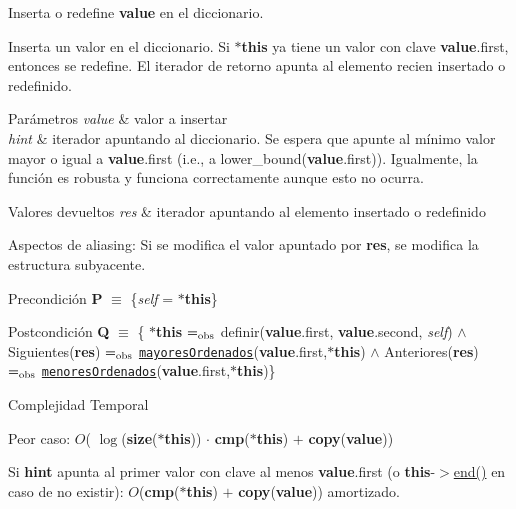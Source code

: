 Inserta o redefine {\bfseries value} en el diccionario. 

Inserta un valor en el diccionario. Si {\bfseries $\ast$this} ya tiene un valor con clave {\bfseries value}.first, entonces se redefine. El iterador de retorno apunta al elemento recien insertado o redefinido.


\begin{DoxyParams}{Parámetros}
{\em value} & valor a insertar \\
\hline
{\em hint} & iterador apuntando al diccionario. Se espera que apunte al mínimo valor mayor o igual a {\bfseries value}.first (i.\-e., a lower\-\_\-bound({\bfseries value}.first)). Igualmente, la función es robusta y funciona correctamente aunque esto no ocurra. \\
\hline
\end{DoxyParams}

\begin{DoxyRetVals}{Valores devueltos}
{\em res} & iterador apuntando al elemento insertado o redefinido\\
\hline
\end{DoxyRetVals}
\begin{DoxyParagraph}{Aspectos de aliasing\-:}
Si se modifica el valor apuntado por {\bfseries res}, se modifica la estructura subyacente.
\end{DoxyParagraph}
\begin{DoxyPrecond}{Precondición}
{\bfseries P} $\equiv$ \{{\itshape self} = {\bfseries $\ast$this}\} 
\end{DoxyPrecond}
\begin{DoxyPostcond}{Postcondición}
{\bfseries Q} $\equiv$ \{ {\bfseries $\ast$this} $=_{\rm obs}$ definir({\bfseries value}.first, {\bfseries value}.second, {\itshape self}) $\land$ Siguientes({\bfseries res}) $=_{\rm obs}$ \href{axiomas.html#mayoresOrdenados}{\tt mayores\-Ordenados}({\bfseries value}.first,{\bfseries $\ast$this}) $\land$ Anteriores({\bfseries res}) $=_{\rm obs}$ \href{axiomas.html#menoresOrdenados}{\tt menores\-Ordenados}({\bfseries value}.first,{\bfseries $\ast$this})\}
\end{DoxyPostcond}

\begin{DoxyDescription}
\item[Complejidad Temporal]
\begin{DoxyItemize}
\item Peor caso\-: $O$( $\log$({\bfseries size}({\bfseries $\ast$this})) $\cdot$ {\bfseries cmp}({\bfseries $\ast$this}) $+$ {\bfseries copy}({\bfseries value}))
\item Si {\bfseries hint} apunta al primer valor con clave al menos {\bfseries value}.first (o {\bfseries this}-\/$>$\hyperlink{classaed2_1_1map_a76023e6a56cb625513e1b5ea028bf983_a76023e6a56cb625513e1b5ea028bf983}{end()} en caso de no existir)\-: $O$({\bfseries cmp}({\bfseries $\ast$this}) $+$ {\bfseries copy}({\bfseries value})) amortizado. 
\end{DoxyItemize}
\end{DoxyDescription}

